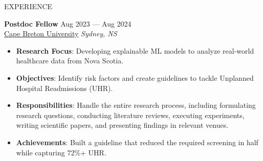 \documentclass{resume} %
\begin{document}
\vspace{-0.4cm}
\begin{rSection}{EXPERIENCE}



\textbf{Postdoc Fellow  } \hfill Aug 2023 --- Aug 2024\\\underline{Cape Breton University} \hfill \textit{Sydney, NS}\\
\vspace{-0.7cm}

\begin{itemize}
    \item \textbf{Research Focus}: Developing explainable ML models to analyze real-world healthcare data from Nova Scotia.
    \vspace{-0.25cm}
    \item \textbf{Objectives}: Identify risk factors and create guidelines to tackle Unplanned Hospital Readmissions (UHR).
    \vspace{-0.25cm} 
    \item \textbf{Responsibilities}: Handle the entire research process, including formulating research questions, conducting literature reviews, executing experiments, writing scientific papers, and presenting findings in relevant venues. 
    \vspace{-0.25cm}
    \item \textbf{Achievements}: Built a guideline that reduced the required screening in half while capturing 72\%+ UHR.
\end{itemize}


\end{rSection}
\end{document}
